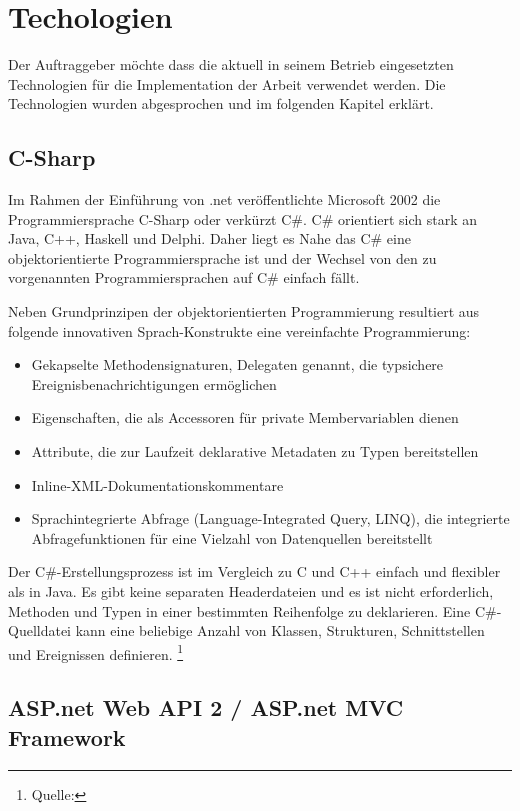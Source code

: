 \section{Techologien}\label{techologien}

Der Auftraggeber möchte dass die aktuell in seinem Betrieb eingesetzten
Technologien für die Implementation der Arbeit verwendet werden. Die
Technologien wurden abgesprochen und im folgenden Kapitel erklärt.

\subsection{C-Sharp}\label{c-sharp}

Im Rahmen der Einführung von .net veröffentlichte Microsoft 2002 die
Programmiersprache C-Sharp oder verkürzt C\#. C\# orientiert sich stark
an Java, C++, Haskell und Delphi. Daher liegt es Nahe das C\# eine
objektorientierte Programmiersprache ist und der Wechsel von den zu
vorgenannten Programmiersprachen auf C\# einfach fällt.

Neben Grundprinzipen der objektorientierten Programmierung resultiert
aus folgende innovativen Sprach-Konstrukte eine vereinfachte
Programmierung:

\begin{itemize}
\tightlist
\item
  Gekapselte Methodensignaturen, Delegaten genannt, die typsichere
  Ereignisbenachrichtigungen ermöglichen
\item
  Eigenschaften, die als Accessoren für private Membervariablen dienen
\item
  Attribute, die zur Laufzeit deklarative Metadaten zu Typen
  bereitstellen
\item
  Inline-XML-Dokumentationskommentare
\item
  Sprachintegrierte Abfrage (Language-Integrated Query, LINQ), die
  integrierte Abfragefunktionen für eine Vielzahl von Datenquellen
  bereitstellt
\end{itemize}

Der C\#-Erstellungsprozess ist im Vergleich zu C und C++ einfach und
flexibler als in Java. Es gibt keine separaten Headerdateien und es ist
nicht erforderlich, Methoden und Typen in einer bestimmten Reihenfolge
zu deklarieren. Eine C\#-Quelldatei kann eine beliebige Anzahl von
Klassen, Strukturen, Schnittstellen und Ereignissen definieren.
\footnote{Quelle:\autocite{csharpbasic}}

\subsection{ASP.net Web API 2 / ASP.net MVC
Framework}\label{asp.net-web-api-2-asp.net-mvc-framework}

